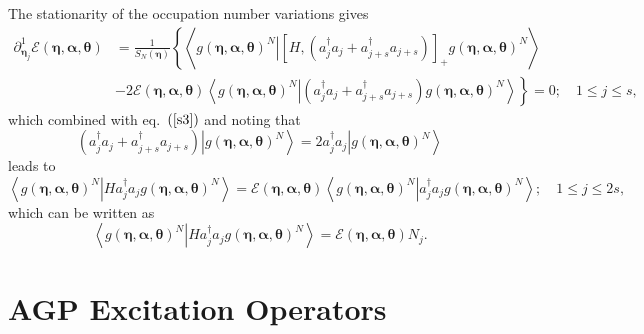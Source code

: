 \documentclass[aps,preprint]{revtex4}%
\begin{document}
The stationarity of the occupation number variations gives
\begin{align}
\partial_{\mathbf{\eta}_{j}}^{1}\mathcal{E}\left(  \mathbf{\eta}%
,\mathbf{\alpha},\mathbf{\theta}\right)   &  =\frac{1}{S_{N}\left(
\mathbf{\eta}\right)  }\left\{  \left\langle \left.  g\left(  \mathbf{\eta
},\mathbf{\alpha},\mathbf{\theta}\right)  ^{N}\right\vert \left[  H,\left(
a_{j}^{\dagger}a_{j}+a_{j+s}^{\dagger}a_{j+s}\right)  \right]  _{+}g\left(
\mathbf{\eta},\mathbf{\alpha},\mathbf{\theta}\right)  ^{N}\right\rangle
\right. \nonumber\\
&  -\left.  2\mathcal{E}\left(  \mathbf{\eta},\mathbf{\alpha},\mathbf{\theta
}\right)  \left\langle \left.  g\left(  \mathbf{\eta},\mathbf{\alpha
},\mathbf{\theta}\right)  ^{N}\right\vert \left(  a_{j}^{\dagger}a_{j}%
+a_{j+s}^{\dagger}a_{j+s}\right)  g\left(  \mathbf{\eta},\mathbf{\alpha
},\mathbf{\theta}\right)  ^{N}\right\rangle \right\}  =0;\quad1\leq j\leq s,
\end{align}
which combined with eq.\ $\left(  \ref{s3}\right)  $ and noting that
\begin{equation}
\left(  a_{j}^{\dagger}a_{j}+a_{j+s}^{\dagger}a_{j+s}\right)  \left\vert
g\left(  \mathbf{\eta},\mathbf{\alpha},\mathbf{\theta}\right)  ^{N}%
\right\rangle =2a_{j}^{\dagger}a_{j}\left\vert g\left(  \mathbf{\eta
},\mathbf{\alpha},\mathbf{\theta}\right)  ^{N}\right\rangle
\end{equation}
leads to
\begin{equation}
\left\langle \left.  g\left(  \mathbf{\eta},\mathbf{\alpha},\mathbf{\theta
}\right)  ^{N}\right\vert Ha_{j}^{\dagger}a_{j}g\left(  \mathbf{\eta
},\mathbf{\alpha},\mathbf{\theta}\right)  ^{N}\right\rangle =\mathcal{E}%
\left(  \mathbf{\eta},\mathbf{\alpha},\mathbf{\theta}\right)  \left\langle
\left.  g\left(  \mathbf{\eta},\mathbf{\alpha},\mathbf{\theta}\right)
^{N}\right\vert a_{j}^{\dagger}a_{j}g\left(  \mathbf{\eta},\mathbf{\alpha
},\mathbf{\theta}\right)  ^{N}\right\rangle ;\quad1\leq j\leq2s,
\end{equation}
which can be written as
\begin{equation}
\left\langle \left.  g\left(  \mathbf{\eta},\mathbf{\alpha},\mathbf{\theta
}\right)  ^{N}\right\vert Ha_{j}^{\dagger}a_{j}g\left(  \mathbf{\eta
},\mathbf{\alpha},\mathbf{\theta}\right)  ^{N}\right\rangle =\mathcal{E}%
\left(  \mathbf{\eta},\mathbf{\alpha},\mathbf{\theta}\right)  N_{j}.
\end{equation}


\section{AGP Excitation Operators\label{q_op}}
\end{document}
